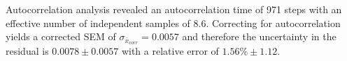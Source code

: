 \documentclass[reqno]{amsart}
\numberwithin{equation}{section}
\numberwithin{figure}{section}
\begin{document}
Autocorrelation analysis revealed an autocorrelation time of 971 steps with an effective number of independent samples of 8.6. Correcting for autocorrelation yields a corrected SEM of $\sigma_{\bar{x}_{corr}} = 0.0057$ and therefore the uncertainty in the residual is $0.0078 \pm 0.0057$ with a relative error of $1.56\% \pm 1.12$. \\

\end{document}
